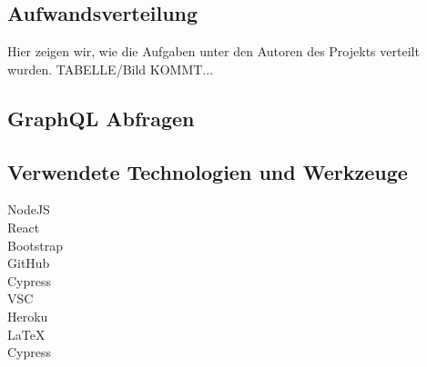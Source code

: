 \subsection{Aufwandsverteilung}\label{subsec_UabsAnhang}
Hier zeigen wir, wie die Aufgaben unter den Autoren des Projekts verteilt wurden.
TABELLE/Bild KOMMT...

\subsection{GraphQL Abfragen}\label{subsec_UabsAnhang}


\subsection{Verwendete Technologien und Werkzeuge}\label{subsec_UabsAnhang}
NodeJS
\\
React
\\
Bootstrap
\\
GitHub
\\
Cypress
\\
VSC
\\
Heroku
\\
LaTeX
\\
Cypress